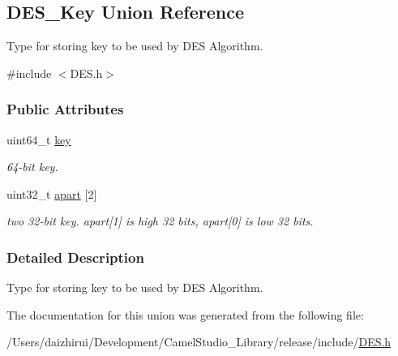 \hypertarget{a00134}{}\subsection{D\+E\+S\+\_\+\+Key Union Reference}
\label{a00134}


Type for storing key to be used by D\+ES Algorithm.  




{\ttfamily \#include $<$D\+E\+S.\+h$>$}

\subsubsection*{Public Attributes}
\begin{DoxyCompactItemize}
\item 
\mbox{\label{a00134_a48b5dadf7decf3076826072563041f1b}} 
uint64\+\_\+t \mbox{\hyperlink{a00134_a48b5dadf7decf3076826072563041f1b}{key}}
\begin{DoxyCompactList}\small\item\em 64-\/bit key. \end{DoxyCompactList}\item 
\mbox{\label{a00134_a3e14395e8ac22e9e775a243041daaeeb}} 
uint32\+\_\+t \mbox{\hyperlink{a00134_a3e14395e8ac22e9e775a243041daaeeb}{apart}} \mbox{[}2\mbox{]}
\begin{DoxyCompactList}\small\item\em two 32-\/bit key. apart\mbox{[}1\mbox{]} is high 32 bits, apart\mbox{[}0\mbox{]} is low 32 bits. \end{DoxyCompactList}\end{DoxyCompactItemize}


\subsubsection{Detailed Description}
Type for storing key to be used by D\+ES Algorithm. 

The documentation for this union was generated from the following file\+:\begin{DoxyCompactItemize}
\item 
/\+Users/daizhirui/\+Development/\+Camel\+Studio\+\_\+\+Library/release/include/\mbox{\hyperlink{a00005}{D\+E\+S.\+h}}\end{DoxyCompactItemize}
